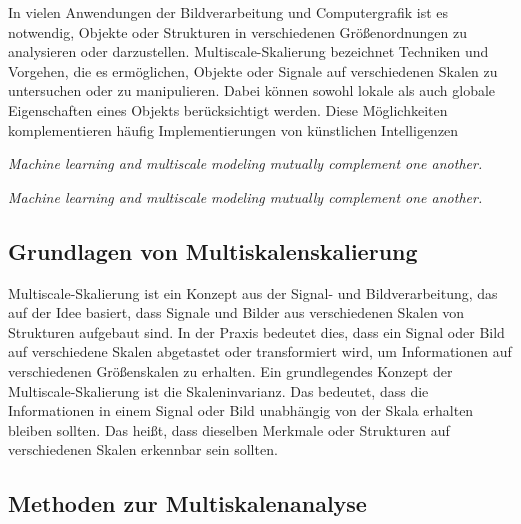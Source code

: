    In vielen Anwendungen der Bildverarbeitung und Computergrafik ist es notwendig, Objekte oder Strukturen in verschiedenen Größenordnungen zu analysieren oder darzustellen.      
    Multiscale-Skalierung bezeichnet Techniken und Vorgehen, die es ermöglichen, Objekte oder Signale auf verschiedenen Skalen zu untersuchen oder zu manipulieren.      
    Dabei können sowohl lokale als auch globale Eigenschaften eines Objekts berücksichtigt werden.
    Diese Möglichkeiten komplementieren häufig Implementierungen von künstlichen Intelligenzen

    \begin{center}
        \textit{Machine learning and multiscale modeling mutually complement one another.}
    \end{center}
    
    \begin{center}
        \textit{Machine learning and multiscale modeling mutually complement one another.}
    \end{center}
    
    \subsection{Grundlagen von Multiskalenskalierung}
    
        Multiscale-Skalierung ist ein Konzept aus der Signal- und Bildverarbeitung, das auf der Idee basiert, dass Signale und Bilder aus verschiedenen Skalen von Strukturen aufgebaut sind.
        In der Praxis bedeutet dies, dass ein Signal oder Bild auf verschiedene Skalen abgetastet oder transformiert wird, um Informationen auf verschiedenen Größenskalen zu erhalten.
        Ein grundlegendes Konzept der Multiscale-Skalierung ist die Skaleninvarianz.      
        Das bedeutet, dass die Informationen in einem Signal oder Bild unabhängig von der Skala erhalten bleiben sollten.      
        Das heißt, dass dieselben Merkmale oder Strukturen auf verschiedenen Skalen erkennbar sein sollten.
    
    \subsection{Methoden zur Multiskalenanalyse}
    
